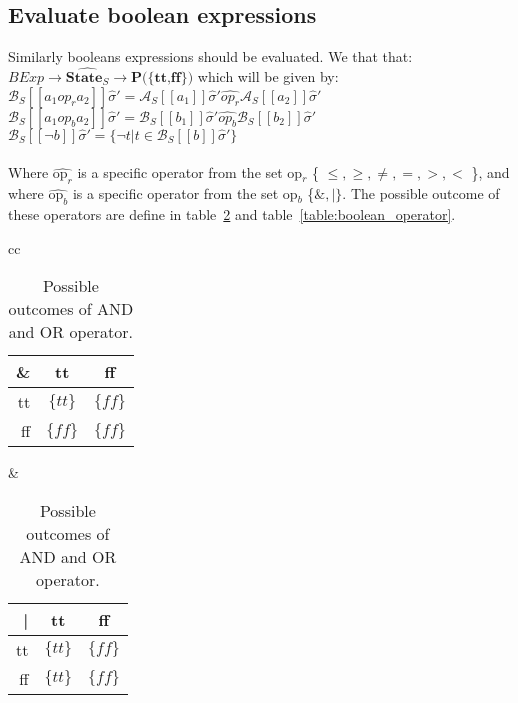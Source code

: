 \subsection{Evaluate boolean expressions}
Similarly booleans expressions should be evaluated. We that that:\\
$BExp \rightarrow \widehat{\textbf{State}_S} \rightarrow \textbf{P(\{tt,ff\})}$ which will be given by:\\
$\mathcal{B}_S [\![a_1op_ra_2]\!]\widehat{\sigma}' = \mathcal{A}_S [\![a_1]\!]\widehat{\sigma}'\widehat{op_r}\mathcal{A}_S [\![a_2]\!]\widehat{\sigma}'$\\
$\mathcal{B}_S [\![a_1op_ba_2]\!]\widehat{\sigma}' = \mathcal{B}_S [\![b_1]\!]\widehat{\sigma}'\widehat{op_b}\mathcal{B}_S [\![b_2]\!]\widehat{\sigma}'$\\
$\mathcal{B}_S [\![\neg b]\!]\widehat{\sigma}' =\{\neg t|t\in \mathcal{B}_S[\![b]\!]\widehat{\sigma}'\}$\\
\\
Where $\widehat{\text{op}_r}$ is a specific  operator from the set op$_r$ \{ $\leq,\geq,\neq,=,>,<$ \}, and where $\widehat{\text{op}_b}$ is a specific operator from the set op$_b$ \{$\&,|\}$. The possible outcome of these operators are define in table~\ref{table:or_operator} and table~\ref{table:boolean_operator}.

\begin{table}
\begin{tabular}{cc}
    \begin{minipage}{0.3\linewidth}
		\begin{tabular}{| r | c | c |}
		\hline
		 \&   & tt   & ff  \\
		\hline
		 tt  & $\{tt\}$ & $\{ff\}$  \\
		\hline
		 ff  & $\{ff\}$ & $\{ff\}$ \\
		\hline
		\end{tabular}
    \end{minipage} &

    \begin{minipage}{0.3\linewidth}
		\begin{tabular}{| r | c | c |}
		\hline
		 |   & tt   & ff  \\
		\hline
		 tt  & $\{tt\}$ & $\{ff\}$  \\
		\hline
		 ff  & $\{tt\}$ & $\{ff\}$ \\
		\hline
		\end{tabular}
    \end{minipage}
\end{tabular}
\centering
\caption{Possible outcomes of AND and OR operator.}
\label{table:or_operator}
\end{table}

